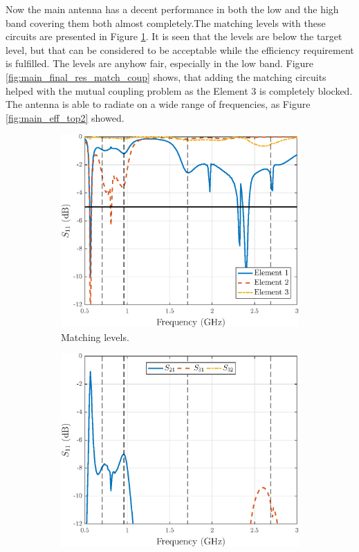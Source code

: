 Now the main antenna has a decent performance in both the low and the high band covering them both almost completely.The matching levels with these circuits are presented in Figure \ref{fig:main_final_res_match}. It is seen that the levels are below the target level, but that can be considered to be acceptable while the efficiency requirement is fulfilled. The levels are anyhow fair, especially in the low band. Figure \ref{fig:main_final_res_match_coup} shows, that adding the matching circuits helped with the mutual coupling problem as the Element 3 is completely blocked. The antenna is able to radiate on a wide range of frequencies, as Figure \ref{fig:main_eff_top2} showed.  
\begin{figure}[H]
    \centering
    \begin{subfigure}[b]{0.49\textwidth}
        \includegraphics[width=\textwidth]{img/main_final_res_match.eps}
        \caption{Matching levels.}
        \label{fig:main_final_res_match}
    \end{subfigure}
    \begin{subfigure}[b]{0.49\textwidth}
        \includegraphics[width=\textwidth]{img/main_final_res_match_coup.eps}

\end{subfigure}
\end{figure}
